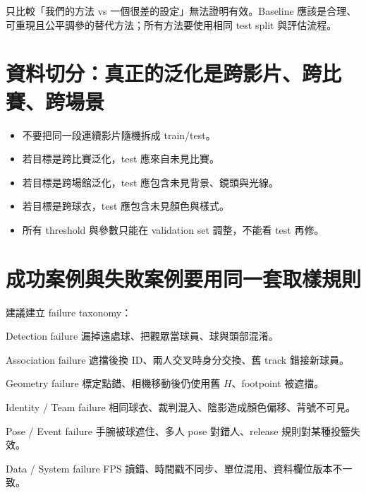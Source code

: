 \documentclass[11pt,a4paper,oneside]{report}
\begin{document}
\begin{riskBox}
只比較「我們的方法 vs 一個很差的設定」無法證明有效。Baseline 應該是合理、可重現且公平調參的替代方法；所有方法要使用相同 test split 與評估流程。
\end{riskBox}

\section{資料切分：真正的泛化是跨影片、跨比賽、跨場景}

\begin{itemize}
  \item 不要把同一段連續影片隨機拆成 train/test。
  \item 若目標是跨比賽泛化，test 應來自未見比賽。
  \item 若目標是跨場館泛化，test 應包含未見背景、鏡頭與光線。
  \item 若目標是跨球衣，test 應包含未見顏色與樣式。
  \item 所有 threshold 與參數只能在 validation set 調整，不能看 test 再修。
\end{itemize}

\section{成功案例與失敗案例要用同一套取樣規則}

建議建立 failure taxonomy：

\begin{tcbraster}[raster columns=2,raster equal height=rows,raster column skip=7pt,raster row skip=7pt]
\begin{termBox}{Detection failure}
漏掉遠處球、把觀眾當球員、球與頭部混淆。
\end{termBox}
\begin{termBox}{Association failure}
遮擋後換 ID、兩人交叉時身分交換、舊 track 錯接新球員。
\end{termBox}
\begin{termBox}{Geometry failure}
標定點錯、相機移動後仍使用舊 $H$、footpoint 被遮擋。
\end{termBox}
\begin{termBox}{Identity / Team failure}
相同球衣、裁判混入、陰影造成顏色偏移、背號不可見。
\end{termBox}
\begin{termBox}{Pose / Event failure}
手腕被球遮住、多人 pose 對錯人、release 規則對某種投籃失效。
\end{termBox}
\begin{termBox}{Data / System failure}
FPS 讀錯、時間戳不同步、單位混用、資料欄位版本不一致。
\end{termBox}
\end{tcbraster}
\end{document}

